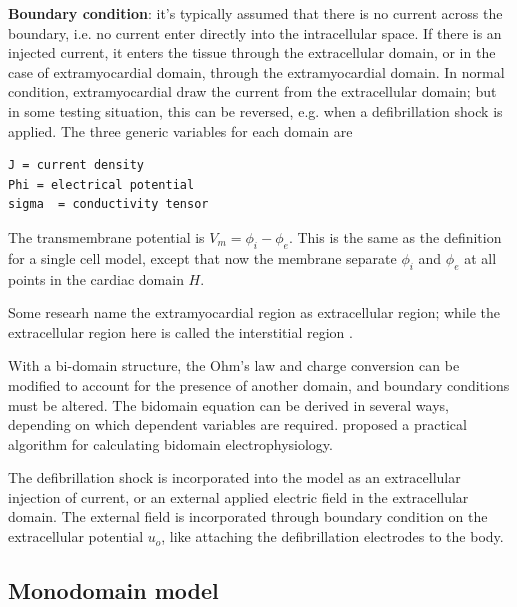 {\bf Boundary condition}: it's typically assumed that there is no current across
the boundary, i.e. no current enter directly into the intracellular space. If
there is an injected current, it enters the tissue through the extracellular
domain, or in the case of extramyocardial domain, through the extramyocardial
domain. In normal condition, extramyocardial draw the current from the
extracellular domain; but in some testing situation, this can be reversed, e.g.
when a defibrillation shock is applied. The three generic variables for each
domain are
\begin{verbatim}
J = current density
Phi = electrical potential
sigma  = conductivity tensor
\end{verbatim}
The transmembrane potential is $V_m=\phi_i-\phi_e$. This is the same as the
definition for a single cell model, except that now the membrane separate
$\phi_i	$ and $\phi_e$ at all points in the cardiac domain $H$.

\begin{framed}
Some researh name the extramyocardial region as extracellular region; while the
extracellular region here is called the interstitial region
\citep{henriquez1990}.
\end{framed}

With a bi-domain structure, the Ohm's law and charge conversion can be modified
to account for the presence of another domain, and boundary conditions must be
altered. The bidomain equation can be derived in several ways, depending on
which dependent variables are required. \citep{keener1998} proposed a practical
algorithm for calculating bidomain electrophysiology.


The defibrillation shock is incorporated into the model as an
extracellular injection of current, or an external applied electric
field in the extracellular domain. The external field is incorporated
through boundary condition on the extracellular potential $u_o$, like
attaching the defibrillation electrodes to the body.

\subsection{Monodomain model}
\label{sec:cont-monod-model}

